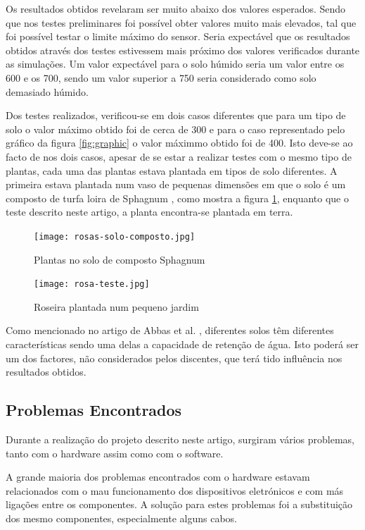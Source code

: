 \documentclass[conference]{IEEEtran}
\begin{document}
Os resultados obtidos revelaram ser muito abaixo dos valores esperados. Sendo que nos testes preliminares 
foi possível obter valores muito mais elevados, tal que foi possível testar o limite máximo do sensor. Seria 
expectável que os resultados obtidos através dos testes estivessem mais próximo dos valores verificados 
durante as simulações. Um valor expectável para o solo húmido seria um valor entre os 600 e os 700, sendo 
um valor superior a 750 seria considerado como solo demasiado húmido.

Dos testes realizados, verificou-se em dois casos diferentes que para um tipo de solo o valor máximo obtido foi 
de cerca de 300 e para o caso representado pelo gráfico da figura \ref{fig:graphic} o valor máximmo 
obtido foi de 400.
Isto deve-se ao facto de nos dois casos, apesar de se estar a realizar testes com o mesmo tipo de plantas, 
cada uma das plantas estava plantada em tipos de solo diferentes. A primeira estava plantada num vaso de 
pequenas dimensões em que o solo é um composto de turfa loira de Sphagnum \cite{jardinssintra}, 
como mostra a figura \ref{fig:testconditions}, enquanto que o teste descrito neste artigo, 
a planta encontra-se plantada em terra. 

\begin{figure}[h]
    \centering
    \texttt{[image: rosas-solo-composto.jpg]}
    \caption{Plantas no solo de composto Sphagnum}
    \label{fig:testconditions}
\end{figure}

\begin{figure}[h]
    \centering
    \texttt{[image: rosa-teste.jpg]}
    \caption{Roseira plantada num pequeno jardim}
    \label{fig:roseground}
\end{figure}

Como mencionado no artigo de Abbas et al. \cite{abbas2014smart}, diferentes solos têm diferentes características 
sendo uma delas a capacidade de retenção de água. Isto poderá ser um dos factores, não considerados pelos 
discentes, que terá tido influência nos resultados obtidos.

\subsection{Problemas Encontrados}

Durante a realização do projeto descrito neste artigo, surgiram vários problemas, tanto com o hardware 
assim como com o software.

A grande maioria dos problemas encontrados com o hardware estavam relacionados com o mau funcionamento dos 
dispositivos eletrónicos e com más ligações entre os componentes. A solução para estes problemas foi a 
substituição dos mesmo componentes, especialmente alguns cabos.
\end{document}
